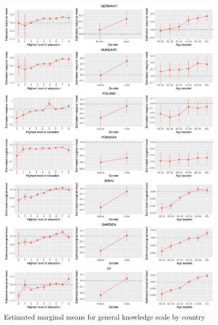 \documentclass[12pt,halfline,a4paper,]{ouparticle}
\begin{document}
\begin{figure}[!h]
\includegraphics[width=1\linewidth]{Revisiting-the-Measurement-and-Dimensionality-of-Political-Knowledge--Evidence-from-Seven-European-Countries_files/figure-latex/emmeans_plots3a-1} \caption{Estimated marginal means for general knowledge scale by country}\label{fig:emmeans_plots3a}
\end{figure}
\end{document}
